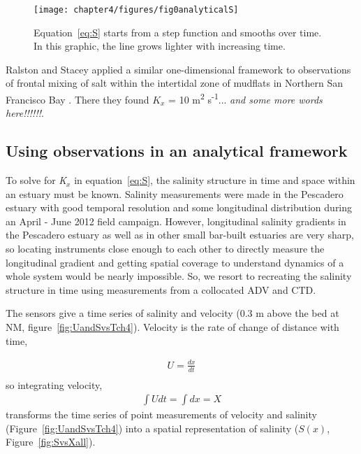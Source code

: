 \begin{figure}[h!]
\texttt{[image: chapter4/figures/fig0analyticalS]}
\caption{Equation~\ref{eq:S} starts from a step function and smooths over time. In this graphic, the line grows lighter with increasing time.} \label{fig:Sgraphic}
\end{figure}

Ralston and Stacey applied a similar one-dimensional framework to observations of frontal mixing of salt within the intertidal zone of mudflats in Northern San Francisco Bay \parencite*{Ralston:2005aa}. There they found $K_x$ = 10 m\textsuperscript{2} s\textsuperscript{-1}... \emph{and some more words here!!!!!!}. 

\subsection{Using observations in an analytical framework} \label{ssec:ObsInto1DAdvDiff}
To solve for \emph{K$_x$} in equation~\ref{eq:S}, the salinity structure in time and space within an estuary must be known. Salinity measurements were made in the Pescadero estuary with good temporal resolution and some longitudinal distribution during an April - June 2012 field campaign. However, longitudinal salinity gradients in the Pescadero estuary as well as in other small bar-built estuaries are very sharp, so locating instruments close enough to each other to directly measure the longitudinal gradient and getting spatial coverage to understand dynamics of a whole system would be nearly impossible. So, we resort to recreating the salinity structure in time using measurements from a collocated ADV and CTD. 

The sensors give a time series of salinity and velocity (0.3 m above the bed at NM, figure~\ref{fig:UandSvsTch4}). Velocity is the rate of change of distance with time,

\begin{eqnarray}
U = \frac{dx}{dt} \label{eq:uEdxdt}\\
\end{eqnarray}
so integrating velocity,
\begin{eqnarray}
\int{Udt} = \int{dx} = X \label{eq:intuEx}
\end{eqnarray}
transforms the time series of point measurements of velocity and salinity (Figure~\ref{fig:UandSvsTch4}) into a spatial representation of salinity ($S(x)$, Figure~\ref{fig:SvsXall}).

